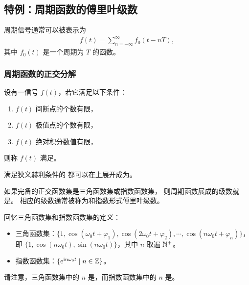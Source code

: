 \subsection{特例：周期函数的傅里叶级数}

\begin{remark}
    周期信号通常可以被表示为
    \begin{align*}
        f(t) = \sum_{n = -\infty}^{\infty} f_0(t - nT),
    \end{align*}
    其中 $f_0(t)$ 是一个周期为 $T$ 的函数。
\end{remark}

\subsubsection{周期函数的正交分解}

\begin{definition}[狄义赫利条件]
    设有一信号 $f(t)$，若它满足以下条件：
    \begin{enumerate}[label=(\arabic*)]
        \item $f(t)$ 间断点的个数有限，
        \item $f(t)$ 极值点的个数有限，
        \item $f(t)$ 绝对积分数值有限，
    \end{enumerate}
    则称 $f(t)$ 满足。
\end{definition}

\begin{property}
    满足狄义赫利条件的
    都可以在上展开成为。
\end{property}

\begin{definition}[傅里叶级数展开]
    如果完备的正交函数集是三角函数集或指数函数集，
    则周期函数展成的级数就是。
    相应的级数通常被称为和{指数形式傅里叶级数}。
\end{definition}

\begin{note}
    回忆三角函数集和指数函数集的定义：
    \begin{itemize}
        \item 三角函数集：$\{1, \cos(\omega_0t + \varphi_1), \cos(2\omega_0t + \varphi_2), \cdots, \cos(n\omega_0 t + \varphi_n)\}$，
            即 $\{1, \cos(n\omega_0t), \sin(n\omega_0t)\}$，其中 $n$ 取遍 $\mathbb{N}^{+}$。
        \item 指数函数集：$\{\mathrm{e}^{\mathrm{i} n\omega_0t} \mid n \in \mathbb{Z}\}$。
    \end{itemize}
    请注意，三角函数集中的 $n$ 是，而指数函数集中的 $n$ 是。
\end{note}

